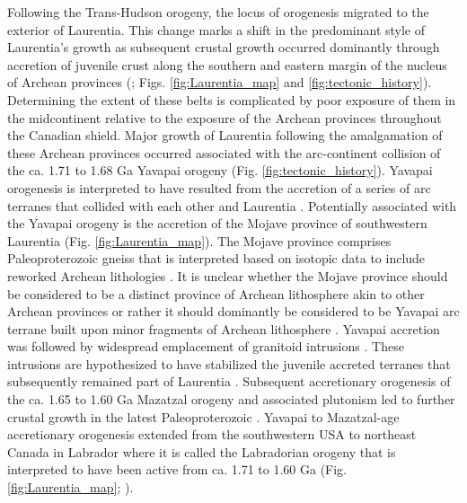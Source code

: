 \documentclass[twocolumn, switch]{article} %
\begin{document}
Following the Trans-Hudson orogeny, the locus of orogenesis migrated to the exterior of Laurentia. This change marks a shift in the predominant style of Laurentia's growth as subsequent crustal growth occurred dominantly through accretion of juvenile crust along the southern and eastern margin of the nucleus of Archean provinces (\citealp{Whitmeyer2007a}; Figs. \ref{fig:Laurentia_map} and \ref{fig:tectonic_history}). Determining the extent of these belts is complicated by poor exposure of them in the midcontinent relative to the exposure of the Archean provinces throughout the Canadian shield. Major growth of Laurentia following the amalgamation of these Archean provinces occurred associated with the arc-continent collision of the ca. 1.71 to 1.68 Ga Yavapai orogeny (Fig. \ref{fig:tectonic_history}). Yavapai orogenesis is interpreted to have resulted from the accretion of a series of arc terranes that collided with each other and Laurentia \citep{Karlstrom2001a}. Potentially associated with the Yavapai orogeny is the accretion of the Mojave province of southwestern Laurentia (Fig. \ref{fig:Laurentia_map}). The Mojave province comprises Paleoproterozoic gneiss that is interpreted based on isotopic data to include reworked Archean lithologies \citep{Bennett1987a}. It is unclear whether the Mojave province should be considered to be a distinct province of Archean lithosphere akin to other Archean provinces or rather it should dominantly be considered to be Yavapai arc terrane built upon minor fragments of Archean lithosphere \citep{Whitmeyer2007a}. Yavapai accretion was followed by widespread emplacement of granitoid intrusions \citep{Whitmeyer2007a}. These intrusions are hypothesized to have stabilized the juvenile accreted terranes that subsequently remained part of Laurentia \citep{Whitmeyer2007a}. Subsequent accretionary orogenesis of the ca. 1.65 to 1.60 Ga Mazatzal orogeny and associated plutonism led to further crustal growth in the latest Paleoproterozoic \citep{Karlstrom1988a}. Yavapai to Mazatzal-age accretionary orogenesis extended from the southwestern USA to northeast Canada in Labrador where it is called the Labradorian orogeny that is interpreted to have been active from ca. 1.71 to 1.60 Ga (Fig. \ref{fig:Laurentia_map}; \citealp{Gower1992a, Gower2008b}). 
\end{document}
